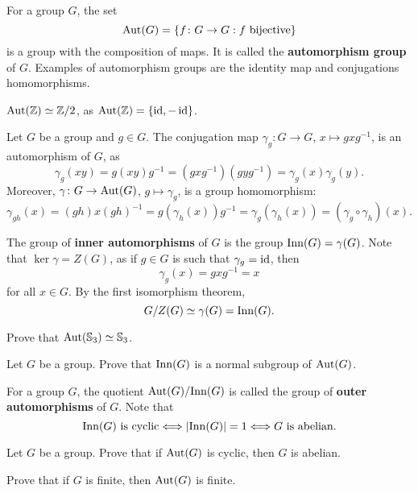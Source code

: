 For a group $G$, 
the set 
\[
\operatorname{Aut}(G)=\{f\colon G\to G:f\text{ bijective}\}
\]
is a group with the composition of maps. It is called 
the \textbf{automorphism group} of $G$. 
Examples of automorphism groups are the identity map and 
conjugations homomorphisms. 

\begin{example}
$\operatorname{Aut}(\mathbb{Z})\simeq\mathbb{Z}/2$, as $\operatorname{Aut}(\mathbb{Z})=\{\operatorname{id},-\operatorname{id}\}$.
\end{example}

\begin{example}
Let $G$ be a group and $g\in G$. The conjugation 
map $\gamma_g\colon G\to G$, $x\mapsto gxg^{-1}$,
is an automorphism of $G$, as 
\[
\gamma_g(xy)=g(xy)g^{-1}=(gxg^{-1})(gyg^{-1})=\gamma_g(x)\gamma_g(y).
\]
Moreover, $\gamma\colon G\to\operatorname{Aut}(G)$, $g\mapsto\gamma_g$, is a group
homomorphism:
\[
\gamma_{gh}(x)=(gh)x(gh)^{-1}=g(\gamma_h(x))g^{-1}=\gamma_g(\gamma_h(x))=(\gamma_g\circ\gamma_h)(x).
\]

The group of \textbf{inner automorphisms} of $G$ is the 
group 
$\mathrm{Inn}(G)=\gamma(G)$. Note that $\ker\gamma=Z(G)$, as
if $g\in G$ is such that $\gamma_g=\operatorname{id}$, then 
\[
\gamma_g(x)=gxg^{-1}=x
\]
for all $x\in G$. By the first isomorphism theorem, 
\[
G/Z(G)\simeq \gamma(G)=\mathrm{Inn}(G).
\]
\end{example}

\begin{exercise}
\label{xca:aut(S3)}
    Prove that $\operatorname{Aut}(\mathbb{S}_3)\simeq\mathbb{S}_3$. 
\end{exercise}

\begin{exercise}
    Let $G$ be a group. Prove that $\mathrm{Inn}(G)$ is a normal subgroup of $\operatorname{Aut}(G)$. 
\end{exercise} 

For a group $G$, the quotient $\operatorname{Aut}(G)/\mathrm{Inn}(G)$ is called 
the group of \textbf{outer automorphisms} of $G$. 
Note that 
\[
\mathrm{Inn}(G)\text{ is cyclic}\Longleftrightarrow
|\mathrm{Inn}(G)|=1\Longleftrightarrow
G\text{ is abelian.}
\]

\begin{exercise}
Let $G$ be a group. 
Prove that if $\operatorname{Aut}(G)$ is cyclic, then 
$G$ is abelian. 
\end{exercise}

\begin{exercise}
    Prove that if $G$ is finite, then $\operatorname{Aut}(G)$ is finite.
\end{exercise}



